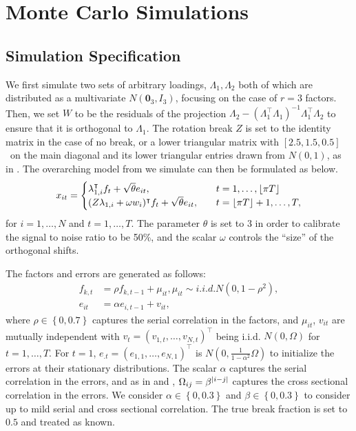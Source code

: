 \documentclass[12pt]{article}
\newcommand*{\tran}{\intercal}
\theoremstyle{plain}
\numberwithin{equation}{section}
\begin{document}
\section{Monte Carlo Simulations}
\label{sec:monte_carlo}
\subsection{Simulation Specification}
We first simulate two sets of arbitrary loadings, $\Lambda_1, \Lambda_2$ both of which are distributed as a multivariate $N(\mathbf{0}_3, I_3)$, focusing on the case of $r = 3$ factors. Then, we set $W$ to be the residuals of the projection $\Lambda_2 - (\Lambda_1^\tran \Lambda_1)^{-1} \Lambda_1^\tran \Lambda_2$ to ensure that it is orthogonal to $\Lambda_1$. The rotation break $Z$ is set to the identity matrix in the case of no break, or a lower triangular matrix with $[2.5, 1.5, 0.5]$ on the main diagonal and its lower triangular entries drawn from $N(0, 1)$, as in \textcite{duan_quasi-maximum_2022}. The overarching model from we simulate can then be formulated as below.
\begin{align}
\label{eqn:overall_sim}
x_{it} = 
\begin{cases}
\lambda_{1, i}^\tran f_t + \sqrt{\theta} e_{it}, &\quad t = 1, \dots, \floor{\pi T} \\
(Z \lambda_{1, i} + \omega w_{i})^\tran f_t + \sqrt{\theta} e_{it}, &\quad t = \floor{\pi T} + 1, \dots, T,
\end{cases}
\end{align}
for $i = 1, \dots, N$ and $t = 1, \dots, T$. The parameter $\theta$ is set to $3$ in order to calibrate the signal to noise ratio to be 50\%, and the scalar $\omega$ controls the ``size'' of the orthogonal shifts.

The factors and errors are generated as follows:
\begin{align}
f_{k, t} &= \rho f_{k, t - 1} + \mu_{it}, \mu_{it} \sim i.i.d. N(0, 1 - \rho^2), \\
e_{it} &= \alpha e_{i, t - 1} + v_{it},
\end{align}
where $\rho \in \left\lbrace 0, 0.7 \right\rbrace$ captures the serial correlation in the factors, and $\mu_{it}$, $v_{it}$ are mutually independent with $v_{t} = (v_{1, t}, \dots, v_{N, t})^\tran$ being i.i.d. $N(0, \Omega)$ for $t = 1, \dots, T$. For $t = 1$, $e_{.t} = (e_{1, 1}, \dots, e_{N, 1})^\tran$ is $N(0, \frac{1}{1 - \alpha^2} \Omega)$ to initialize the errors at their stationary distributions. The scalar $\alpha$ captures the serial correlation in the errors, and as in \textcite{bates_consistent_2013} and \textcite{baltagi_identification_2017}, $\Omega_{ij} = \beta^{\abs{i - j}}$ captures the cross sectional correlation in the errors. We consider $\alpha \in \left\lbrace 0, 0.3 \right\rbrace $ and $\beta \in \left\lbrace 0, 0.3 \right\rbrace $ to consider up to mild serial and cross sectional correlation. The true break fraction is set to $0.5$ and treated as known. 
\end{document}

